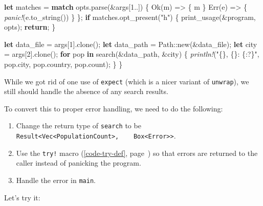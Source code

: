 \documentclass[a4paper,]{book}
\renewcommand*{\hyperref}[2][\ar]{%
  \def\ar{#2}%
  #2 (\autoref{#1}, page~\pageref{#1})}
\newenvironment{Shaded}{\begin{snugshade}}{\end{snugshade}}
\newcommand{\KeywordTok}[1]{\textcolor[rgb]{0.13,0.29,0.53}{\textbf{{#1}}}}
\newcommand{\DecValTok}[1]{\textcolor[rgb]{0.00,0.00,0.81}{{#1}}}
\newcommand{\ConstantTok}[1]{\textcolor[rgb]{0.00,0.00,0.00}{{#1}}}
\newcommand{\StringTok}[1]{\textcolor[rgb]{0.31,0.60,0.02}{{#1}}}
\newcommand{\PreprocessorTok}[1]{\textcolor[rgb]{0.56,0.35,0.01}{\textit{{#1}}}}
\newcommand{\NormalTok}[1]{{#1}}
\providecommand{\tightlist}{%
  \setlength{\itemsep}{0pt}\setlength{\parskip}{0pt}}
\begin{document}
\begin{Shaded}
\begin{Highlighting}[]
    \KeywordTok{let} \NormalTok{matches = }\KeywordTok{match} \NormalTok{opts.parse(&args[}\DecValTok{1.}\NormalTok{.]) \{}
        \ConstantTok{Ok}\NormalTok{(m)  => \{ m \}}
        \ConstantTok{Err}\NormalTok{(e) => \{ }\PreprocessorTok{panic!}\NormalTok{(e.to_string()) \}}
    \NormalTok{\};}
    \KeywordTok{if} \NormalTok{matches.opt_present(}\StringTok{"h"}\NormalTok{) \{}
        \NormalTok{print_usage(&program, opts);}
        \KeywordTok{return}\NormalTok{;}
    \NormalTok{\}}

    \KeywordTok{let} \NormalTok{data_file = args[}\DecValTok{1}\NormalTok{].clone();}
    \KeywordTok{let} \NormalTok{data_path = Path::new(&data_file);}
    \KeywordTok{let} \NormalTok{city = args[}\DecValTok{2}\NormalTok{].clone();}
    \KeywordTok{for} \NormalTok{pop }\KeywordTok{in} \NormalTok{search(&data_path, &city) \{}
        \PreprocessorTok{println!}\NormalTok{(}\StringTok{"\{\}, \{\}: \{:?\}"}\NormalTok{, pop.city, pop.country, pop.count);}
    \NormalTok{\}}
\NormalTok{\}}
\end{Highlighting}
\end{Shaded}

While we got rid of one use of \texttt{expect} (which is a nicer variant
of \texttt{unwrap}), we still should handle the absence of any search
results.

To convert this to proper error handling, we need to do the following:

\begin{enumerate}
\def\labelenumi{\arabic{enumi}.}
\tightlist
\item
  Change the return type of \texttt{search} to be
  \texttt{Result\textless{}Vec\textless{}PopulationCount\textgreater{},\ \ \ \ Box\textless{}Error\textgreater{}\textgreater{}}.
\item
  Use the \hyperref[code-try-def]{\texttt{try!} macro} so that errors
  are returned to the caller instead of panicking the program.
\item
  Handle the error in \texttt{main}.
\end{enumerate}

Let's try it:
\end{document}
